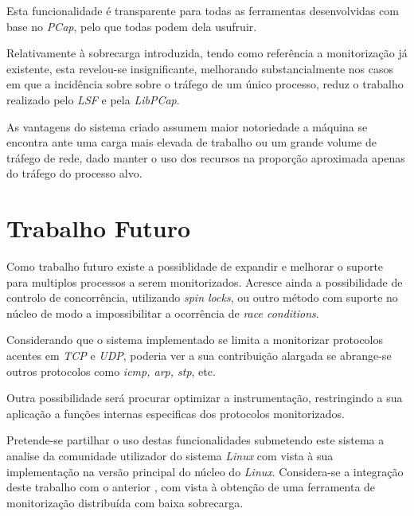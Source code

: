 Esta funcionalidade é transparente para todas as ferramentas desenvolvidas com base no \textit{PCap}, pelo que todas podem dela usufruir.

Relativamente à sobrecarga introduzida, tendo como referência a monitorização já existente, esta revelou-se insignificante, melhorando substancialmente nos casos em que a incidência sobre sobre o tráfego de um único processo, reduz o trabalho realizado pelo \textit{LSF} e pela \textit{LibPCap}.

As vantagens do sistema criado assumem maior notoriedade a máquina se encontra ante uma carga mais elevada de trabalho ou um grande volume de tráfego de rede, dado manter o uso dos recursos na proporção aproximada apenas do tráfego do processo alvo.


\section{Trabalho Futuro}
\label{sec:future_work}
Como trabalho futuro existe a possiblidade de expandir e melhorar o suporte para multiplos processos a serem monitorizados.
Acresce ainda a possibilidade de controlo de concorrência, utilizando \textit{spin locks}, ou outro método com suporte no núcleo de modo a impossibilitar a ocorrência de \textit{race conditions}.

Considerando que o sistema implementado se limita a monitorizar protocolos acentes em \textit{TCP} e \textit{UDP}, poderia ver a sua contribuição alargada se abrange-se outros protocolos como \textit{icmp, arp, stp}, etc.

Outra possibilidade será procurar optimizar a instrumentação, restringindo a sua aplicação a funções internas especificas dos protocolos monitorizados.

Pretende-se partilhar o uso destas funcionalidades submetendo este sistema a analise da comunidade utilizador do sistema \textit{Linux} com vista à sua implementação na versão principal do núcleo do \textit{Linux}.
Considera-se a integração deste trabalho com o anterior \cite{duarte10,Farruca:2009}, com vista à obtenção de uma ferramenta de monitorização distribuída com baixa sobrecarga.
